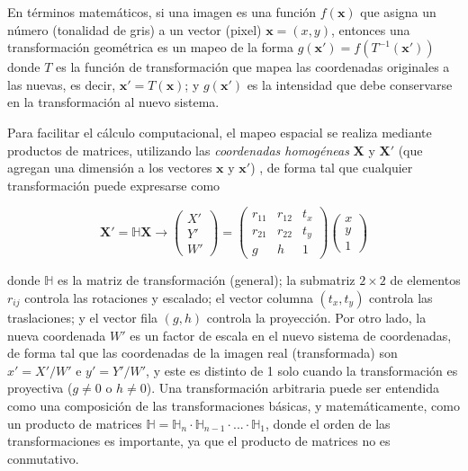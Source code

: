 En términos matemáticos, si una imagen es una función
$f(\mathbf{x})$ que asigna un número (tonalidad de gris) a un vector (pixel) $\mathbf{x} = (x,y)$,
entonces una transformación geométrica es un mapeo de la forma $g(\mathbf{x'})=
f(T^{-1}(\mathbf{x'}))$ donde $T$ es la función de transformación que mapea las
coordenadas originales a las nuevas, es decir, $\mathbf{x'}=T(\mathbf{x})$; y $g(\mathbf{x'})$
es la intensidad que debe conservarse en la transformación al nuevo sistema. 

Para facilitar el cálculo computacional, el mapeo espacial se realiza mediante
productos de matrices, utilizando las \textit{coordenadas homogéneas} $\mathbf{X}$
y $\mathbf{X'}$  (que agregan una dimensión a los vectores $\mathbf{x}$ y
$\mathbf{x'}$) \cite{Rhody2005}, de forma tal que cualquier transformación puede expresarse como

\begin{equation}
    \mathbf{X'}=\mathbb{H}\mathbf{X}
    \longrightarrow
    \begin{pmatrix}
        X' \\
        Y' \\
        W'
    \end{pmatrix}
    =
    \begin{pmatrix}
        r_{11} & r_{12} & t_x \\
        r_{21} & r_{22} & t_y \\
        g & h & 1
    \end{pmatrix}
    \begin{pmatrix}
        x \\
        y \\
        1
    \end{pmatrix}
    \label{eq:coord_homog}
\end{equation}

\noindent donde $\mathbb{H}$ es la matriz de transformación (general); la submatriz $2\times
2$ de elementos $r_{ij}$ controla las rotaciones y escalado; el vector columna
$(t_x, t_y)$ controla las traslaciones; y el vector fila $(g,h)$ controla la
proyección. Por otro lado, la nueva coordenada $W'$ es un factor de escala en
el nuevo sistema de coordenadas, de forma tal que las coordenadas de la imagen
real (transformada) son $x'=X'/W'$ e $y'=Y'/W'$, y este es distinto de 1 solo
cuando la transformación es proyectiva ($g\neq 0$ o $h\neq 0$). Una transformación
arbitraria puede ser entendida como una composición de las transformaciones básicas, y
matemáticamente, como un producto de matrices $\mathbb{H} = \mathbb{H}_n \cdot \mathbb{H}_{n-1}
\cdot ... \cdot \mathbb{H}_1$, donde el orden de las transformaciones es importante,
ya que el producto de matrices no es conmutativo. \cite{Rhody2005}

